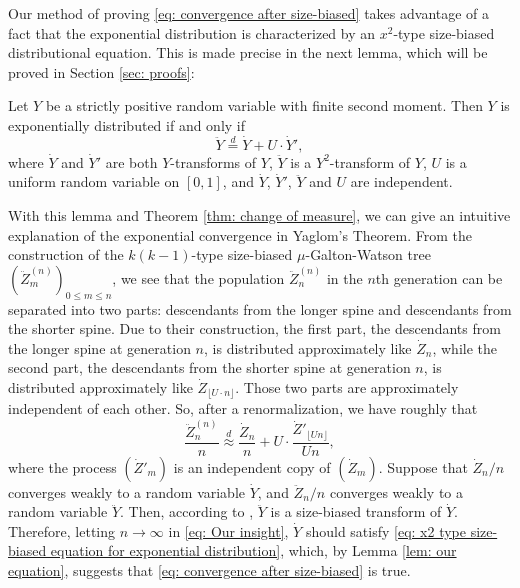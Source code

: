 \documentclass[ECP]{ejpecp} %
\begin{document}
Our method of proving
\eqref{eq: convergence after size-biased}
takes advantage of a fact that the exponential distribution is characterized by an $x^2$-type size-biased distributional equation.
This is made precise in the next lemma, which will be proved in Section \ref{sec: proofs}:
\begin{lemma} \label{lem: our equation}
	Let $Y$ be a strictly positive random variable with finite second moment.
	Then $Y$ is exponentially distributed if and only if
	\begin{equation}
	\label{eq: x2 type size-biased equation for exponential distribution}
	\ddot Y \overset{d}
	= \dot Y + U \cdot \dot Y',
	\end{equation}
	where $\dot Y$ and $\dot Y'$ are both $Y$-transforms of  $Y$,
	$\ddot Y$ is a $Y^2$-transform of $Y$,
	$U$ is a uniform random variable on $[0,1]$, and $\dot Y$, $\dot Y'$, $\ddot Y$
	and $U$ are independent.
\end{lemma}	
	With this lemma and Theorem \ref{thm: change of measure}, we can give an intuitive explanation of the exponential convergence in Yaglom's Theorem.
	From the construction of the $k(k-1)$-type size-biased $\mu$-Galton-Watson tree $(\ddot Z^{(n)}_m)_{0\le m\le n}$, we see that the population $\ddot Z^{(n)}_n$ in the $n$th generation can be separated into two parts: 
	descendants from the longer spine and descendants from the shorter spine.
	Due to their construction, the first part, the descendants from the longer spine at generation $n$, is distributed approximately like $\dot Z_n$, while the second part, the descendants from the shorter spine at generation $n$, 
	is distributed approximately like $\dot Z_{ \lfloor U\cdot n \rfloor}$.
	Those two parts are approximately independent of each other.
	So, after a renormalization, we have roughly that
\[\label{eq: Our insight}
	\frac{\ddot Z_n^{(n)}}{n}
	\overset{d} \approx \frac{\dot Z_n}{n} + U \cdot \frac{   \dot Z'_{  \lfloor U n \rfloor  }   }    {   Un   },
\]
where the process $(\dot Z'_m)$ is an independent copy of $(\dot Z_m)$.
Suppose that $\dot Z_n/n$ converges weakly to a random variable $\dot Y$, and $\ddot Z_n/n$ converges weakly to a random variable $\ddot Y$.
Then, according to \cite[Lemma 4.3]{lyons1995conceptual}, $\ddot Y$ is a size-biased transform of $\dot Y$.
Therefore, letting $n\to\infty$ in \eqref{eq: Our insight},
$\dot Y$ should satisfy \eqref{eq: x2 type size-biased equation for exponential distribution}, which, by Lemma \ref{lem: our equation}, suggests that \eqref{eq: convergence after size-biased} is true.
\end{document}

